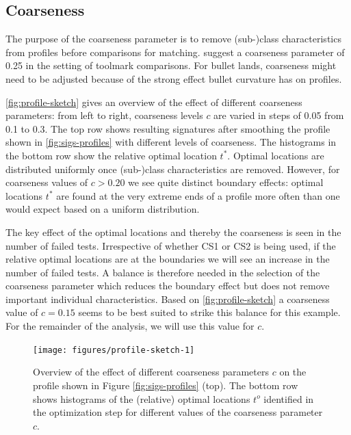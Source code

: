 \documentclass[12pt]{article}
\begin{document}
\hypertarget{coarseness}{%
\subsection{Coarseness}\label{coarseness}}

The purpose of the coarseness parameter is to remove (sub-)class
characteristics from profiles before comparisons for matching.
\citet{hadler} suggest a coarseness parameter of 0.25 in the setting of
toolmark comparisons. For bullet lands, coarseness might need to be
adjusted because of the strong effect bullet curvature has on profiles.

\autoref{fig:profile-sketch} gives an overview of the effect of
different coarseness parameters: from left to right, coarseness levels
\(c\) are varied in steps of 0.05 from 0.1 to 0.3. The top row shows
resulting signatures after smoothing the profile shown in
\autoref{fig:sigs-profiles} with different levels of coarseness. The
histograms in the bottom row show the relative optimal location \(t^*\).
Optimal locations are distributed uniformly once (sub-)class
characteristics are removed. However, for coarseness values of
\(c > 0.20\) we see quite distinct boundary effects: optimal locations
\(t^*\) are found at the very extreme ends of a profile more often than
one would expect based on a uniform distribution.

The key effect of the optimal locations and thereby the coarseness is
seen in the number of failed tests. Irrespective of whether CS1 or CS2
is being used, if the relative optimal locations are at the boundaries
we will see an increase in the number of failed tests. A balance is
therefore needed in the selection of the coarseness parameter which
reduces the boundary effect but does not remove important individual
characteristics. Based on \autoref{fig:profile-sketch} a coarseness
value of \(c = 0.15\) seems to be best suited to strike this balance for
this example. For the remainder of the analysis, we will use this value
for \(c\).

\begin{figure}

{\centering \texttt{[image: figures/profile-sketch-1]} 

}

\caption{Overview of the effect of different coarseness parameters $c$ on the profile shown in Figure \ref{fig:sigs-profiles} (top). The bottom row shows histograms of  the (relative) optimal locations $t^o$ identified in the optimization step for different values of the coarseness parameter $c$. }\label{fig:profile-sketch}
\end{figure}
\end{document}
